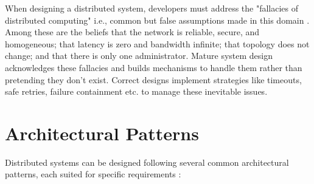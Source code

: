 When designing a distributed system, developers must address the "fallacies of distributed computing" i.e., common but false assumptions made in this domain \cite{wilson_eight_nodate}. Among these are the beliefs that the network is reliable, secure, and homogeneous; that latency is zero and bandwidth infinite; that topology does not change; and that there is only one administrator. Mature system design acknowledges these fallacies and builds mechanisms to handle them rather than pretending they don't exist. Correct designs implement strategies like timeouts, safe retries, failure containment etc. to manage these inevitable issues.

\section{Architectural Patterns}
\label{sec:architecture-patterns}
Distributed systems can be designed following several common architectural patterns, each suited for specific requirements \cite{steen_distributed_2023}:

